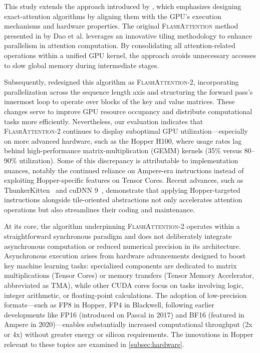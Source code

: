 This study extends the approach introduced by \citet{dao2022flashattention}, which emphasizes designing exact-attention algorithms by aligning them with the GPU's execution mechanisms and hardware properties. The original \textsc{FlashAttention} method presented in \citep{dao2022flashattention} by Dao et al. leverages an innovative tiling methodology to enhance parallelism in attention computation. By consolidating all attention-related operations within a unified GPU kernel, the approach avoids unnecessary accesses to slow global memory during intermediate stages.

Subsequently, \citet{dao2023flashattention2} redesigned this algorithm as \textsc{FlashAttention-2}, incorporating parallelization across the sequence length axis and structuring the forward pass's innermost loop to operate over blocks of the key and value matrices. These changes serve to improve GPU resource occupancy and distribute computational tasks more efficiently. Nevertheless, our evaluation indicates that \textsc{FlashAttention-2} continues to display suboptimal GPU utilization—especially on more advanced hardware, such as the Hopper H100, where usage rates lag behind high-performance matrix-multiplication (GEMM) kernels (35\% versus 80–90\% utilization). Some of this discrepancy is attributable to implementation nuances, notably the continued reliance on Ampere-era instructions instead of exploiting Hopper-specific features on Tensor Cores. Recent advances, such as ThunkerKitten~\citep{spector2024thunder} and cuDNN 9~\citep{cudnn9}, demonstrate that applying Hopper-targeted instructions alongside tile-oriented abstractions not only accelerates attention operations but also streamlines their coding and maintenance.

At its core, the algorithm underpinning \textsc{FlashAttention-2} operates within a straightforward synchronous paradigm and does not deliberately integrate asynchronous computation or reduced numerical precision in its architecture. Asynchronous execution arises from hardware advancements designed to boost key machine learning tasks: specialized components are dedicated to matrix multiplications (Tensor Cores) or memory transfers (Tensor Memory Accelerator, abbreviated as TMA), while other CUDA cores focus on tasks involving logic, integer arithmetic, or floating-point calculations. The adoption of low-precision formats—such as FP8 in Hopper, FP4 in Blackwell, following earlier developments like FP16 (introduced on Pascal in 2017) and BF16 (featured in Ampere in 2020)—enables substantially increased computational throughput (2x or 4x) without greater energy or silicon requirements. The innovations in Hopper relevant to these topics are examined in \cref{subsec:hardware}. 

